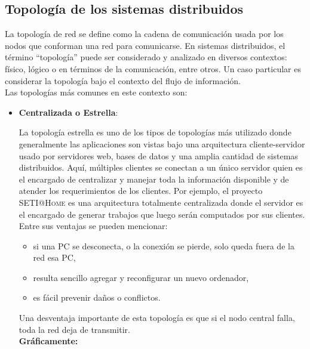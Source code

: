 \subsection{Topología de los sistemas distribuidos}

La topología de red se define como la cadena de comunicación usada por los nodos que conforman una red para comunicarse. 
En sistemas distribuidos, el término ``topología'' puede ser considerado y analizado en diversos contextos: físico, lógico o en términos de la comunicación, entre otros. Un caso particular es considerar la topología bajo el contexto del flujo de información. \\
Las topologías más comunes en este contexto son:

\begin{itemize}

 \item \textbf{Centralizada o Estrella}:

La topología estrella es uno de los tipos de topologías más utilizado donde generalmente las aplicaciones son vistas bajo una arquitectura cliente-servidor usado por servidores web, bases de datos y una amplia cantidad de sistemas distribuidos. Aquí, múltiples clientes se conectan a un único servidor quien es el encargado de centralizar y manejar toda la información disponible y de atender los requerimientos de los clientes. Por ejemplo, el proyecto \textsc{SETI@Home} es una arquitectura totalmente centralizada donde el servidor es el encargado de generar trabajos que luego serán computados por sus clientes. Entre sus ventajas se pueden mencionar: 

\begin{itemize}
\item si una PC se desconecta, o la conexión se pierde, solo queda fuera de la red esa PC,
\item resulta sencillo agregar y reconfigurar un nuevo ordenador,
\item es fácil prevenir daños o conflictos.
\end{itemize}

Una desventaja importante de esta topología es que si el nodo central falla, toda la red deja de transmitir.\\

\textbf{Gráficamente: }


\end{itemize}
